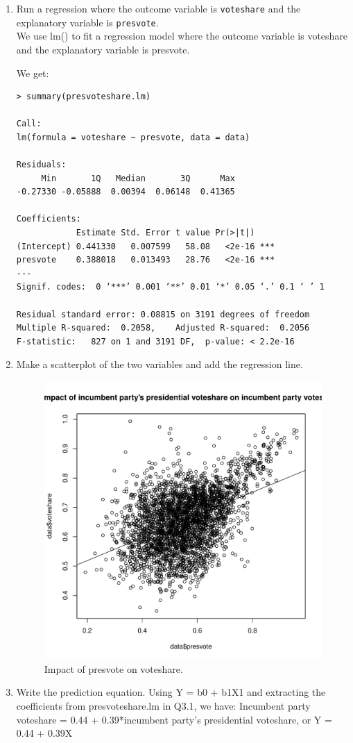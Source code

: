 \documentclass[12pt,letterpaper]{article}
\begin{document}
	\begin{enumerate}
		\item Run a regression where the outcome variable is \texttt{voteshare} and the explanatory variable is \texttt{presvote}.\\
\noindent We use lm() to fit a regression model where the outcome variable is voteshare and the explanatory variable is presvote.\\
\vspace{.5cm}
  
\vspace{.5cm}  
\noindent We get:\\
\begin{verbatim}
> summary(presvoteshare.lm)

Call:
lm(formula = voteshare ~ presvote, data = data)

Residuals:
     Min       1Q   Median       3Q      Max 
-0.27330 -0.05888  0.00394  0.06148  0.41365 

Coefficients:
            Estimate Std. Error t value Pr(>|t|)    
(Intercept) 0.441330   0.007599   58.08   <2e-16 ***
presvote    0.388018   0.013493   28.76   <2e-16 ***
---
Signif. codes:  0 ‘***’ 0.001 ‘**’ 0.01 ‘*’ 0.05 ‘.’ 0.1 ‘ ’ 1

Residual standard error: 0.08815 on 3191 degrees of freedom
Multiple R-squared:  0.2058,	Adjusted R-squared:  0.2056 
F-statistic:   827 on 1 and 3191 DF,  p-value: < 2.2e-16
\end{verbatim}
			\vspace{5cm}
		\item Make a scatterplot of the two variables and add the regression line. 
  
\vspace{.5cm}  
\begin{figure}[h!]\centering
	\caption{\footnotesize Impact of presvote on voteshare.}
	\label{fig:plot_9}
	\includegraphics[width=.5\textwidth]{plot9_presvote_voteshare.pdf}
\end{figure}
		\item Write the prediction equation.
\noindent Using Y = b0 + b1X1 and extracting the coefficients from presvoteshare.lm in Q3.1, we have: Incumbent party voteshare = 0.44 + 0.39*incumbent party's presidential voteshare, or Y = 0.44 + 0.39X\\
	\end{enumerate}
\end{document}

